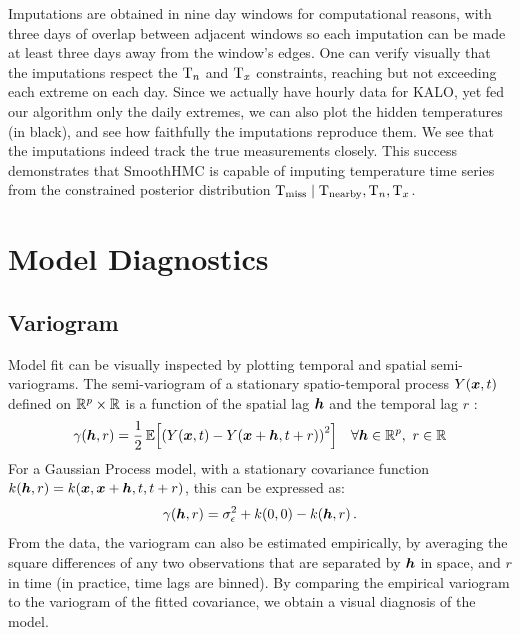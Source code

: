 \documentclass[12pt]{article}
\begin{document}
Imputations are obtained in nine day windows for computational reasons, with three days of overlap between adjacent windows so each imputation can be made at least three days away from the window's edges.
One can verify visually that the imputations respect the \(\mathrm{T}_{n}\) and \(\mathrm{T}_{x}\) constraints, reaching but not exceeding each extreme on each day.
Since we actually have hourly data for KALO, yet fed our algorithm only the daily extremes, we can also plot the hidden temperatures (in black), and see how faithfully the imputations reproduce them.
We see that the imputations indeed track the true measurements closely.
This success demonstrates that SmoothHMC is capable of imputing temperature time series from the constrained posterior distribution \(\mathrm{T}_{\mathrm{miss}} \mid \mathrm{T}_{\mathrm{nearby}}, \mathrm{T}_{n}, \mathrm{T}_{x}\).

\section{Model Diagnostics}
\label{sec:diagnostics}

\subsection{Variogram}\label{variogram}

Model fit can be visually inspected by plotting temporal and spatial semi-variograms. 
The semi-variogram  of a stationary spatio-temporal process \(Y(\bm{x},t)\) defined on \(\mathbb{R}^p \times \mathbb{R}\) is a function of the spatial lag \(\bm{h}\) and the temporal lag \(r\) \citep[see for example][chapter 6]{sherman2011spatial}:
\begin{equation}
    \gamma\del{\hvec,r} = \frac{1}{2} \E\sbr{\del{Y\del{\xvec,t}-Y\del{\xvec+\hvec,t+r}}^2}
    \quad
    \forall \hvec \in \reals^p,\ r \in \reals
\end{equation}
For a Gaussian Process model, with a stationary covariance function \(k(\bm{h},r)=k(\bm{x},\bm{x}+\bm{h},t,t+r)\), this can be expressed as:
\begin{equation}
    \label{eq:gp_variogram}
    \gamma\del{\hvec,r} = \sigman^2 + k\del{0,0} - k(\hvec,r)\,.
\end{equation}
From the data, the variogram can also be estimated empirically, by averaging the square differences of any two observations that are separated by \(\bm{h}\) in space, and \(r\) in time (in practice, time lags are binned).
By comparing the empirical variogram to the variogram of the fitted covariance, 
we obtain a visual diagnosis of the model.
\end{document}
